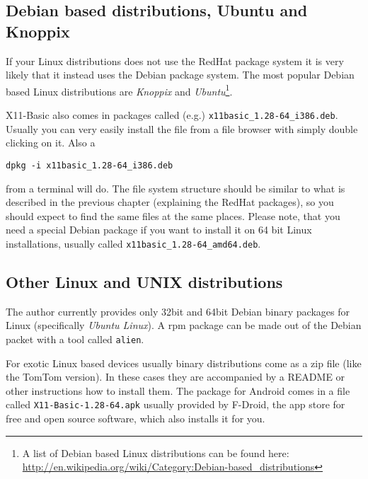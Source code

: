 \subsection*{Debian based distributions, Ubuntu and Knoppix}

If your Linux distributions does not use the RedHat package system it is very
likely that it instead uses the Debian package system. The most popular Debian
based Linux distributions are {\it Knoppix} and {\it Ubuntu}\footnote{A list of
Debian based Linux distributions can be found here:
\url{http://en.wikipedia.org/wiki/Category:Debian-based_distributions}}. 

X11-Basic also comes in packages called (e.g.)
\verb|x11basic_1.28-64_i386.deb|. Usually you can very easily install the file
from a file browser with simply double clicking on it. Also a 
\begin{verbatim}
dpkg -i x11basic_1.28-64_i386.deb
\end{verbatim} 
from a terminal will do. The file system structure should be similar
to what is described in the previous chapter (explaining the RedHat packages),
so you should expect to find the same files at the same places. Please note, 
that you need a special Debian package if you want to install it on 64 bit Linux
installations, usually called \verb|x11basic_1.28-64_amd64.deb|. 

\subsection*{Other Linux and UNIX distributions}

The author currently provides only 32bit and 64bit Debian binary packages for 
Linux (specifically {\it Ubuntu Linux}). A
rpm package can be made out of the Debian packet with a tool called
\verb|alien|. 

For exotic Linux based devices usually binary distributions come as a zip file
(like the TomTom version). In these cases they are accompanied by a README or
other instructions how to install them. The package for Android comes in a file
called \verb|X11-Basic-1.28-64.apk| usually provided by F-Droid, the app store 
for free and open source software, which also installs it for you. 

